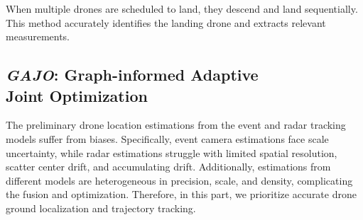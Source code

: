 When multiple drones are scheduled to land, they descend and land sequentially. 
This method accurately identifies the landing drone and extracts relevant measurements.

\vspace{-0.2cm}
\subsection{\textit{GAJO}: Graph-informed Adaptive \\ Joint Optimization} \label{4.2}

The preliminary drone location estimations from the event and radar tracking models suffer from biases. 
Specifically, event camera estimations face scale uncertainty, while radar estimations struggle with limited spatial resolution, scatter center drift, and accumulating drift. 
Additionally, estimations from different models are heterogeneous in precision, scale, and density, complicating the fusion and optimization.
Therefore, in this part, we prioritize accurate drone ground localization and trajectory tracking.


